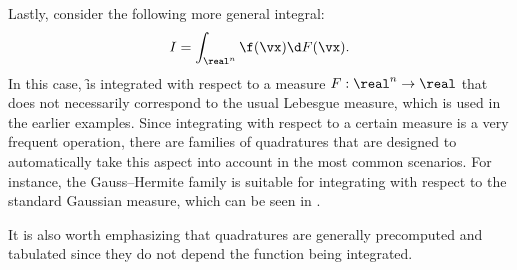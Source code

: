 Lastly, consider the following more general integral:
\[
  I = \int_{\real^n} \f(\vx) \d F(\vx).
\]
In this case, \f is integrated with respect to a measure $F: \real^n \to \real$
\cite{durrett2010} that does not necessarily correspond to the usual Lebesgue
measure, which is used in the earlier examples. Since integrating with respect
to a certain measure is a very frequent operation, there are families of
quadratures that are designed to automatically take this aspect into account in
the most common scenarios. For instance, the Gauss--Hermite family is suitable
for integrating with respect to the standard Gaussian measure, which can be seen
in .

It is also worth emphasizing that quadratures are generally precomputed and
tabulated since they do not depend the function being integrated.
